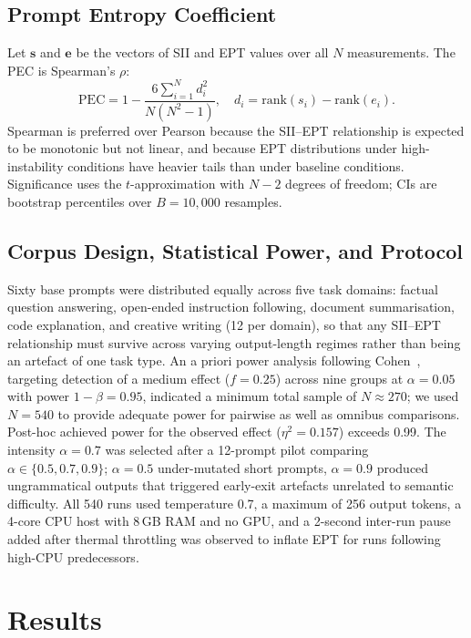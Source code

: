 \documentclass[conference]{IEEEtran}
\begin{document}
\subsection{Prompt Entropy Coefficient}
Let $\mathbf{s}$ and $\mathbf{e}$ be the vectors of SII and EPT
values over all $N$ measurements. The PEC is Spearman's $\rho$:
\begin{equation}
  \mathrm{PEC} = 1 - \frac{6 \sum_{i=1}^{N} d_i^2}{N(N^2 - 1)},
  \quad d_i = \mathrm{rank}(s_i) - \mathrm{rank}(e_i).
  \label{eq:pec}
\end{equation}
Spearman is preferred over Pearson because the SII--EPT relationship
is expected to be monotonic but not linear, and because EPT
distributions under high-instability conditions have heavier tails
than under baseline conditions. Significance uses the $t$-approximation
with $N-2$ degrees of freedom; CIs are bootstrap percentiles over
$B=10{,}000$ resamples.
\subsection{Corpus Design, Statistical Power, and Protocol}
Sixty base prompts were distributed equally across five task domains:
factual question answering, open-ended instruction following, document
summarisation, code explanation, and creative writing (12 per domain),
so that any SII--EPT relationship must survive across varying
output-length regimes rather than being an artefact of one task type.
An a priori power analysis following Cohen~\cite{cohen1988statistical},
targeting detection of a medium effect ($f=0.25$) across nine groups
at $\alpha=0.05$ with power $1-\beta=0.95$, indicated a minimum total
sample of $N \approx 270$; we used $N=540$ to provide adequate power
for pairwise as well as omnibus comparisons. Post-hoc achieved power
for the observed effect ($\eta^2=0.157$) exceeds 0.99.
The intensity $\alpha=0.7$ was selected after a 12-prompt pilot
comparing $\alpha \in \{0.5, 0.7, 0.9\}$; $\alpha=0.5$ under-mutated
short prompts, $\alpha=0.9$ produced ungrammatical outputs that
triggered early-exit artefacts unrelated to semantic difficulty.
All 540 runs used temperature 0.7, a maximum of 256 output tokens, a
4-core CPU host with 8\,GB RAM and no GPU, and a 2-second inter-run
pause added after thermal throttling was observed to inflate EPT for
runs following high-CPU predecessors.
\section{Results}
\label{sec:results}
\end{document}

